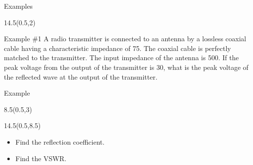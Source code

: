 \begin{frame}{Examples}
	\begin{textblock}{14.5}(0.5,2)
	\begin{myblock}[0.9]{Example \#1}
		A radio transmitter is connected to an antenna by a lossless coaxial cable having a characteristic impedance of 75\ohms. The coaxial cable is perfectly matched to the transmitter. The input impedance of the antenna is 500\ohms. If the peak voltage from the output of the transmitter is 30\volts, what is the peak voltage of the reflected wave at the output of the transmitter. 
	\end{myblock}
	\end{textblock}
\end{frame}
\begin{frame}{Example}
	\begin{textblock}{8.5}(0.5,3)

	
	\end{textblock}
	
	
	
	\begin{textblock}{14.5}(0.5,8.5)
	\begin{itemize}
		\setlength\itemsep{24pt}
		\item Find the reflection coefficient.
		\item Find the VSWR. 
	\end{itemize}
	\end{textblock}	
	
\end{frame}


